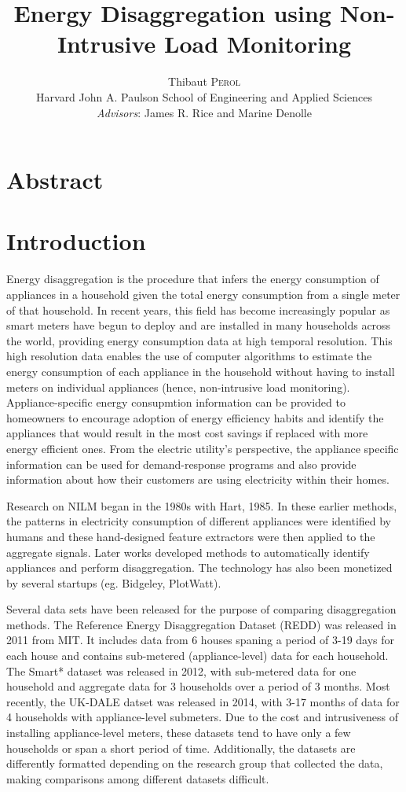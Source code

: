\documentclass[11pt]{article}
\title{Energy Disaggregation using Non-Intrusive Load Monitoring}
\author{Thibaut \textsc{Perol}\\ \small Harvard John A. Paulson School of Engineering and Applied Sciences\\
\textit{Advisors}: James R. Rice and Marine Denolle}
\date{}
\begin{document}
\maketitle


\section{Abstract}

\section{Introduction}
Energy disaggregation is the procedure that infers the energy consumption of appliances in a household given the total energy consumption from a single meter of that household. In recent years, this field has become increasingly popular as smart meters have begun to deploy and are installed in many households across the world, providing energy consumption data at high temporal resolution. This high resolution data enables the use of computer algorithms to estimate the energy consumption of each appliance in the household without having to install meters on individual appliances (hence, non-intrusive load monitoring). Appliance-specific energy consupmtion information can be provided to homeowners to encourage adoption of energy efficiency habits and identify the appliances that would result in the most cost savings if replaced with more energy efficient ones. From the electric utility's perspective, the appliance specific information can be used for demand-response programs and also provide information about how their customers are using electricity within their homes. 

Research on NILM began in the 1980s with Hart, 1985. In these earlier methods, the patterns in electricity consumption of different appliances were identified by humans and these hand-designed feature extractors were then applied to the aggregate signals. Later works \citep{Kelly} developed methods to automatically identify appliances and perform disaggregation. The technology has also been monetized by several startups (eg. Bidgeley, PlotWatt). 

Several data sets have been released for the purpose of comparing disaggregation methods. The Reference Energy Disaggregation Dataset (REDD) \citep{REDD} was released in 2011 from MIT. It includes data from 6 houses spaning a period of 3-19 days for each house and contains sub-metered (appliance-level) data for each household. The Smart* dataset was released in 2012, with sub-metered data for one household and aggregate data for 3 households over a period of 3 months. Most recently, the UK-DALE datset was released in 2014, with 3-17 months of data for 4 households with appliance-level submeters. Due to the cost and intrusiveness of installing appliance-level meters, these datasets tend to have only a few households or span a short period of time. Additionally, the datasets are differently formatted depending on the research group that collected the data, making comparisons among different datasets difficult.  
\end{document}
